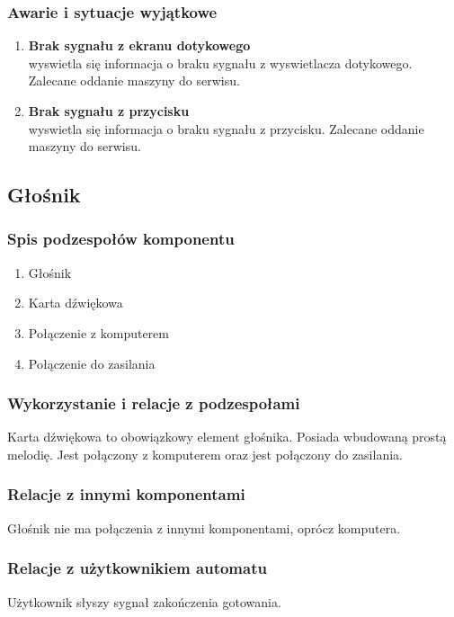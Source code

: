 \documentclass[12pt,a4paper,notitlepage]{article}
\begin{document}
\normalsize

\subsubsection{Awarie i sytuacje wyjątkowe}
\begin{enumerate}
  \item \textbf{Brak sygnału z ekranu dotykowego}\\ wyswietla się informacja o braku sygnału z wyswietlacza dotykowego. Zalecane oddanie maszyny do serwisu.
  \item \textbf{Brak sygnału z przycisku}\\ wyswietla się informacja o braku sygnału z przycisku. Zalecane oddanie maszyny do serwisu.
\end{enumerate}




\subsection{Głośnik}
\subsubsection{Spis podzespołów komponentu}
\begin{enumerate}
  \item Głośnik
  \item Karta dźwiękowa
  \item Połączenie z komputerem
  \item Połączenie do zasilania
\end{enumerate}
 
\subsubsection{Wykorzystanie i relacje z podzespołami}
Karta dźwiękowa to obowiązkowy element głośnika. Posiada wbudowaną prostą melodię. Jest połączony z komputerem oraz jest połączony do zasilania.

\subsubsection{Relacje z innymi komponentami}
Głośnik nie ma połączenia z innymi komponentami, oprócz komputera.

\subsubsection{Relacje z użytkownikiem automatu}
Użytkownik słyszy sygnał zakończenia gotowania.
\end{document}
